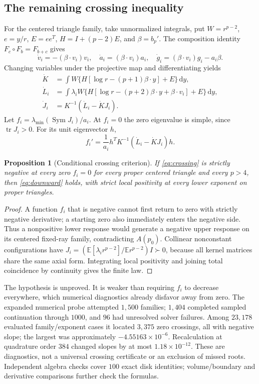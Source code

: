 \documentclass[11pt]{article}
\newtheorem{proposition}[theorem]{Proposition}
\theoremstyle{definition}
\newcommand{\E}{\mathbb E}
\newcommand{\Sym}{\operatorname{Sym}}
\newcommand{\tr}{\operatorname{tr}}
\newcommand{\dd}{\,\mathrm d}
\begin{document}
\subsection{The remaining crossing inequality}
For the centered triangle family, take unnormalized integrals, put
$W=r^{p-2}$, $e=y/r$, $E=ee^T$, $H=I+(p-2)E$, and $\beta=b_p'$.
The composition identity $F_c\circ F_b=F_{b+c}$ gives
\[
 \dot v_i=-(\beta\cdot v_i)v_i,\quad
 \dot a_i=(\beta\cdot v_i)a_i,\quad
 \dot g_i=(\beta\cdot v_i)g_i-a_i\beta.
\]
Changing variables under the projective map and differentiating yields
\begin{align}
 \dot K&=\int W\{H[\log r-(p+1)\beta\cdot y]+E\}\dd y,\nonumber\\
 \dot L_i&=\int\lambda_i W
   \{H[\log r-(p+2)\beta\cdot y+\beta\cdot v_i]+E\}\dd y,\label{eq:crossderiv}\\
 \dot J_i&=K^{-1}(\dot L_i-\dot KJ_i).\nonumber
\end{align}
Let $f_i=\lambda_{\min}(\Sym J_i)/a_i$. At $f_i=0$ the zero eigenvalue
is simple, since $\tr J_i>0$. For its unit eigenvector $h$,
\begin{equation}\label{eq:crossing}
 f_i'=\frac1{a_i}h^TK^{-1}(\dot L_i-\dot KJ_i)h.
\end{equation}
\begin{proposition}[Conditional crossing criterion]
If \eqref{eq:crossing} is strictly negative at every zero $f_i=0$ for
every proper centered triangle and every $p>4$, then \eqref{eq:downward}
holds, with strict local positivity at every lower exponent on proper
triangles.
\end{proposition}
\begin{proof}
A function $f_i$ that is negative cannot first return to zero with strictly
negative derivative; a starting zero also immediately enters the negative
side. Thus a nonpositive lower response would generate a negative upper
response on its centered fixed-ray family, contradicting $A(p_0)$.
Collinear nonconstant configurations have
$J_i=(\E[\lambda_i r^{p-2}]/\E r^{p-2})I\succ0$, because all kernel
matrices share the same axial form. Integrating local positivity and
joining total coincidence by continuity gives the finite law.
\end{proof}
The hypothesis is unproved. It is weaker than requiring $f_i$ to decrease
everywhere, which numerical diagnostics already disfavor away from zero.
The expanded numerical probe attempted $1{,}500$ families; $1{,}404$
completed sampled continuation through $1000$, and $96$ had unresolved
solver failures. Among $23{,}178$ evaluated family/exponent cases it
located $3{,}375$ zero crossings, all with negative slope; the largest
was approximately $-4.55163\times10^{-6}$. Recalculation at quadrature
order $384$ changed slopes by at most $1.18\times10^{-12}$. These are
diagnostics, not a universal crossing certificate or an exclusion of
missed roots. Independent algebra checks cover $100$ exact disk identities;
volume/boundary and derivative comparisons further check the formulas.
\end{document}

